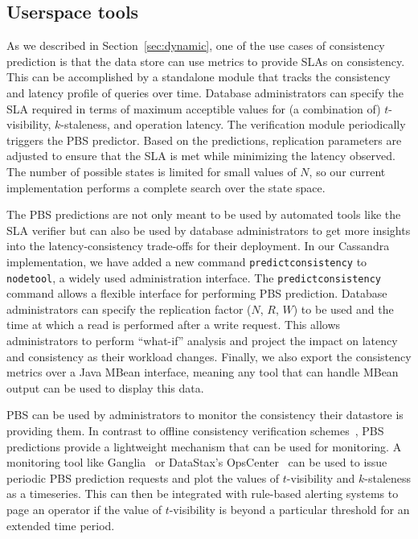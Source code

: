 \subsection{Userspace tools}


As we described in Section~\ref{sec:dynamic}, one of the use cases of
consistency prediction is that the data store can use metrics to
provide SLAs on consistency. This can be accomplished by a standalone
module that tracks the consistency and latency profile of queries over
time. Database administrators can specify the SLA required in terms of
maximum acceptible values for (a combination of) $t$-visibility,
$k$-staleness, and operation latency. The verification module
periodically triggers the PBS predictor. Based on the predictions,
replication parameters are adjusted to ensure that the SLA is met
while minimizing the latency observed. The number of possible states
is limited for small values of $N$, so our current implementation
performs a complete search over the state space.

The PBS predictions are not only meant to be used by automated tools
like the SLA verifier but can also be used by database administrators
to get more insights into the latency-consistency trade-offs for their
deployment. In our Cassandra implementation, we have added a new
command \texttt{predictconsistency} to \texttt{nodetool}, a widely
used administration interface.  The \texttt{predictconsistency}
command allows a flexible interface for performing PBS
prediction. Database administrators can specify the replication factor
($N$, $R$, $W$) to be used and the time at which a read is performed
after a write request. This allows administrators to perform ``what-if''
analysis and project the impact on latency and consistency as their
workload changes.  Finally, we also export the consistency metrics
over a Java MBean interface, meaning any tool that can handle MBean
output can be used to display this data.


PBS can be used by administrators to monitor the consistency their
datastore is providing them. In contrast to offline consistency
verification schemes~\cite{podc-hpl}, PBS predictions provide a
lightweight mechanism that can be used for monitoring. A monitoring
tool like Ganglia~\cite{massie2004ganglia} or DataStax's
OpsCenter~\cite{datastax-opscenter} can be used to issue periodic PBS
prediction requests and plot the values of $t$-visibility and
$k$-staleness as a timeseries. This can then be integrated with
rule-based alerting systems to page an operator if the value of
$t$-visibility is beyond a particular threshold for an extended time
period.


